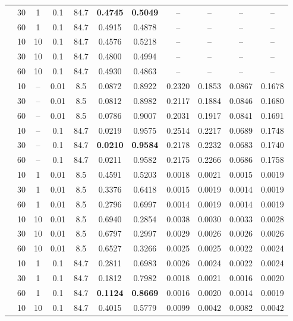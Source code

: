 \documentclass[11pt,twocolumn,a4paper,DIV=calc,parskip=half]{scrartcl}
\begin{document}
\begin{longtable}{@{}l c c c c c c c c c c@{}}
	& 30 & 1 & 0.1 & 84.7 & \textbf{0.4745} & \textbf{0.5049} & -- & -- & -- & -- \\
	& 60 & 1 & 0.1 & 84.7 & 0.4915 & 0.4878 & -- & -- & -- & -- \\
	& 10 & 10 & 0.1 & 84.7 & 0.4576 & 0.5218 & -- & -- & -- & -- \\
	& 30 & 10 & 0.1 & 84.7 & 0.4800 & 0.4994 & -- & -- & -- & -- \\
	& 60 & 10 & 0.1 & 84.7 & 0.4930 & 0.4863 & -- & -- & -- & -- \\
	\arrayrulecolor{gray!60}\midrule\arrayrulecolor{black}
	\multirow{6}{*}{\textbf{FLTrust + TopK}} & 10 & -- & 0.01 & 8.5 & 0.0872 & 0.8922 & 0.2320 & 0.1853 & 0.0867 & 0.1678 \\
	& 30 & -- & 0.01 & 8.5 & 0.0812 & 0.8982 & 0.2117 & 0.1884 & 0.0846 & 0.1680 \\
	& 60 & -- & 0.01 & 8.5 & 0.0786 & 0.9007 & 0.2031 & 0.1917 & 0.0841 & 0.1691 \\
	& 10 & -- & 0.1 & 84.7 & 0.0219 & 0.9575 & 0.2514 & 0.2217 & 0.0689 & 0.1748 \\
	& 30 & -- & 0.1 & 84.7 & \textbf{0.0210} & \textbf{0.9584} & 0.2178 & 0.2232 & 0.0683 & 0.1740 \\
	& 60 & -- & 0.1 & 84.7 & 0.0211 & 0.9582 & 0.2175 & 0.2266 & 0.0686 & 0.1758 \\
	\arrayrulecolor{gray!60}\midrule\arrayrulecolor{black}
	\multirow{12}{*}{\textbf{ALL}} & 10 & 1 & 0.01 & 8.5 & 0.4591 & 0.5203 & 0.0018 & 0.0021 & 0.0015 & 0.0019 \\
	& 30 & 1 & 0.01 & 8.5 & 0.3376 & 0.6418 & 0.0015 & 0.0019 & 0.0014 & 0.0019 \\
	& 60 & 1 & 0.01 & 8.5 & 0.2796 & 0.6997 & 0.0014 & 0.0019 & 0.0014 & 0.0019 \\
	& 10 & 10 & 0.01 & 8.5 & 0.6940 & 0.2854 & 0.0038 & 0.0030 & 0.0033 & 0.0028 \\
	& 30 & 10 & 0.01 & 8.5 & 0.6797 & 0.2997 & 0.0029 & 0.0026 & 0.0026 & 0.0026 \\
	& 60 & 10 & 0.01 & 8.5 & 0.6527 & 0.3266 & 0.0025 & 0.0025 & 0.0022 & 0.0024 \\
	& 10 & 1 & 0.1 & 84.7 & 0.2811 & 0.6983 & 0.0026 & 0.0024 & 0.0022 & 0.0024 \\
	& 30 & 1 & 0.1 & 84.7 & 0.1812 & 0.7982 & 0.0018 & 0.0021 & 0.0016 & 0.0020 \\
	& 60 & 1 & 0.1 & 84.7 & \textbf{0.1124} & \textbf{0.8669} & 0.0016 & 0.0020 & 0.0014 & 0.0019 \\
	& 10 & 10 & 0.1 & 84.7 & 0.4015 & 0.5779 & 0.0099 & 0.0042 & 0.0082 & 0.0042 \\

\end{longtable}
\end{document}
